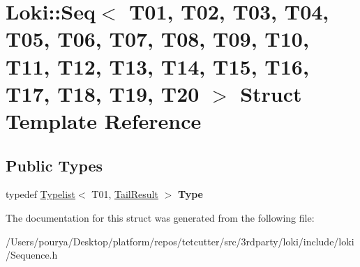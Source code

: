 \hypertarget{structLoki_1_1Seq}{}\section{Loki\+:\+:Seq$<$ T01, T02, T03, T04, T05, T06, T07, T08, T09, T10, T11, T12, T13, T14, T15, T16, T17, T18, T19, T20 $>$ Struct Template Reference}
\label{structLoki_1_1Seq}
\subsection*{Public Types}
\begin{DoxyCompactItemize}
\item 
\hypertarget{structLoki_1_1Seq_ad1ad0ff2705b45e85e3301bd3861d704}{}typedef \hyperlink{structLoki_1_1Typelist}{Typelist}$<$ T01, \hyperlink{structLoki_1_1Typelist}{Tail\+Result} $>$ {\bfseries Type}\label{structLoki_1_1Seq_ad1ad0ff2705b45e85e3301bd3861d704}

\end{DoxyCompactItemize}


The documentation for this struct was generated from the following file\+:\begin{DoxyCompactItemize}
\item 
/\+Users/pourya/\+Desktop/platform/repos/tetcutter/src/3rdparty/loki/include/loki/Sequence.\+h\end{DoxyCompactItemize}
